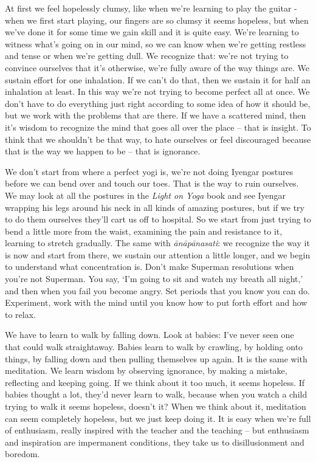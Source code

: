 At first we feel hopelessly clumsy, like when we're learning to play the guitar - when we first start playing, our fingers are so clumsy it seems hopeless, but when we've done it for some time we gain skill and it is quite easy. We're learning to witness what's going on in our mind, so we can know when we're getting restless and tense or when we're getting dull. We recognize that: we're not trying to convince ourselves that it's otherwise, we're fully aware of the way things are. We sustain effort for one inhalation. If we can't do that, then we sustain it for half an inhalation at least. In this way we're not trying to become perfect all at once. We don't have to do everything just right according to some idea of how it should be, but we work with the problems that are there. If we have a scattered mind, then it's wisdom to recognize the mind that goes all over the place -- that is insight. To think that we shouldn't be that way, to hate ourselves or feel discouraged because that is the way we happen to be -- that is ignorance.

We don't start from where a perfect yogi is, we're not doing Iyengar postures before we can bend over and touch our toes. That is the way to ruin ourselves. We may look at all the postures in the \textit{Light on Yoga} book and see Iyengar wrapping his legs around his neck in all kinds of amazing postures, but if we try to do them ourselves they'll cart us off to hospital. So we start from just trying to bend a little more from the waist, examining the pain and resistance to it, learning to stretch gradually. The same with \textit{\=an\=ap\=anasati}: we recognize the way it is now and start from there, we sustain our attention a little longer, and we begin to understand what concentration is. Don't make Superman resolutions when you're not Superman. You say, `I'm going to sit and watch my breath all night,' and then when you fail you become angry. Set periods that you know you can do. Experiment, work with the mind until you know how to put forth effort and how to relax.

We have to learn to walk by falling down. Look at babies: I've never seen one that could walk straightaway. Babies learn to walk by crawling, by holding onto things, by falling down and then pulling themselves up again. It is the same with meditation. We learn wisdom by observing ignorance, by making a mistake, reflecting and keeping going. If we think about it too much, it seems hopeless. If babies thought a lot, they'd never learn to walk, because when you watch a child trying to walk it seems hopeless, doesn't it? When we think about it, meditation can seem completely hopeless, but we just keep doing it. It is easy when we're full of enthusiasm, really inspired with the teacher and the teaching -- but enthusiasm and inspiration are impermanent conditions, they take us to disillusionment and boredom.


